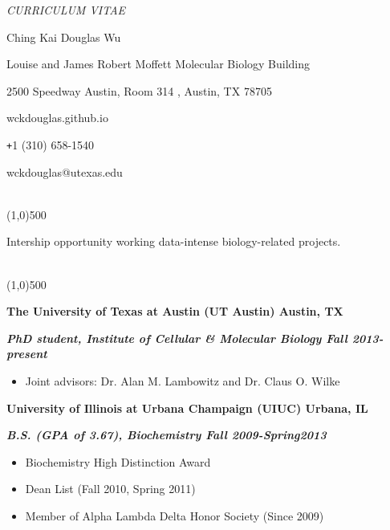 \documentclass[dvips,11pt]{article}
\begin{document}
\centerline{\it \small CURRICULUM VITAE}
\vspace{2mm}
\centerline{\Large Ching Kai Douglas Wu}  
\centerline{ Louise and James Robert Moffett Molecular Biology Building}
\centerline{2500 Speedway Austin, Room 314 , Austin, TX 78705} 
\centerline{wckdouglas.github.io}
\centerline{\texttt{+}1 (310) 658-1540}
\centerline{wckdouglas@utexas.edu}
\vspace{.5mm}

 \vspace{-2mm}
\\\noindent \line(1,0){500}\\
\noindent \centerline{Intership opportunity working data-intense biology-related projects.\hfill}  
\vspace{-5mm}
\bigskip

 \vspace{-2mm}
\\\noindent \line(1,0){500}\\
\noindent \centerline{\bf The University of Texas at Austin (UT Austin) \hfill Austin, TX}
\noindent \centerline{\textit{\textbf{PhD student, Institute of Cellular \& Molecular Biology \hfill Fall 2013-present}}}
\vspace{-5mm}
\begin{spacing}{0.2}
\begin{itemize} \parskip 0pt \parsep 0pt
	\setlength{\itemsep}{0pt}
	\item Joint advisors: Dr. Alan M. Lambowitz and Dr. Claus O. Wilke 
	\end{itemize}
\end{spacing} 

\bigskip
\noindent \centerline{\bf University of Illinois at Urbana Champaign (UIUC) \hfill Urbana, IL}
\noindent \centerline{{\textit{\textbf{B.S. (GPA of 3.67), Biochemistry \hfill Fall 2009-Spring2013}}}}
\vspace{-5mm}
\begin{itemize} \itemsep 1pt \parskip 0pt \parsep 0pt
	\setlength{\itemsep}{0pt}
	\item Biochemistry High Distinction Award
	\item Dean List (Fall 2010, Spring 2011)
	\item Member of Alpha Lambda Delta Honor Society (Since 2009)
	\end{itemize}
\vspace{-2mm}
\bigskip
\end{document}
